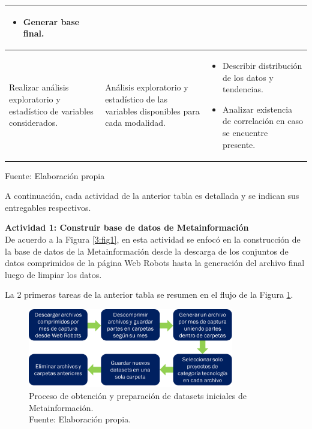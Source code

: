 \begin{longtable}{|M{4cm}|M{5.5cm}|M{5.5cm}|}
\begin{itemize}[noitemsep,leftmargin=*]
		\item Generar base final.
	\end{itemize}
	\\
	\hline
	Realizar análisis exploratorio y estadístico de variables considerados.
	& Análisis exploratorio y estadístico de las variables disponibles para cada modalidad.
	& 
	\begin{itemize}[noitemsep,leftmargin=*]
		\item Describir distribución de los datos y tendencias.
		\item Analizar existencia de correlación en caso se encuentre presente.
	\end{itemize}
	\\
	\hline
\end{longtable}%

\begin{flushleft}	%
	\small Fuente: Elaboración propia
\end{flushleft}

A continuación, cada actividad de la anterior tabla es detallada y se indican sus entregables respectivos.

\textbf{Actividad 1: Construir base de datos de Metainformación}
\\
De acuerdo a la Figura \ref{3:fig1}, en esta actividad se enfocó en la construcción de la base de datos de la Metainformación desde la descarga de los conjuntos de datos comprimidos de la página Web Robots hasta la generación del archivo final luego de limpiar los datos.

La 2 primeras tareas de la anterior tabla se resumen en el flujo de la Figura \ref{3:fig3}.

\begin{figure}[h]
	\begin{center}
		\includegraphics[width=0.8\textwidth]{3/figures/flujograma_metadata_t1_t2.png}
		\caption[Proceso de obtención y preparación de datasets iniciales de Metainformación]{Proceso de obtención y preparación de datasets iniciales de Metainformación.\\
			Fuente: Elaboración propia.}
		\label{3:fig3}
	\end{center}
\end{figure}

